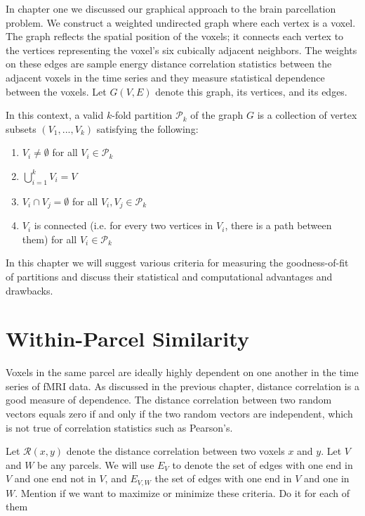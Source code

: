 
In chapter one we discussed our graphical approach to the brain
parcellation problem. We construct a weighted undirected graph where
each vertex is a voxel. The graph reflects the spatial position of the
voxels; it connects each vertex to the vertices representing the voxel's
six cubically adjacent neighbors. The weights on these edges are sample
energy distance correlation statistics between the adjacent voxels in
the time series and they measure statistical dependence between the
voxels. Let $G(V, E)$ denote this graph, its vertices, and its edges.

In this context, a valid $k$-fold partition $\mathcal{P}_k$ of the
graph $G$ is a collection of vertex subsets $(V_1, ..., V_k)$
satisfying the following:

\begin{enumerate}[1.]
\item
$V_i \neq \emptyset$ for all $V_i \in \mathcal{P}_k$

\item
$\bigcup\limits_{i=1}^k V_i = V$

\item
$V_i \cap V_j = \emptyset$ for all $V_i, V_j \in \mathcal{P}_k$

\item
$V_i$ is connected (i.e. for every two vertices in $V_i$, there is a
path between them) for all $V_i \in \mathcal{P}_k$
\end{enumerate}

In this chapter we will suggest various criteria for measuring the
goodness-of-fit of partitions and discuss their statistical and
computational advantages and drawbacks.


\section{Within-Parcel Similarity}

Voxels in the same parcel are ideally highly dependent on one another in
the time series of fMRI data. As discussed in the previous chapter,
distance correlation is a good measure of dependence. The distance
correlation between two random vectors equals zero if and only if the
two random vectors are independent, which is not true of correlation
statistics such as Pearson's.

Let $\mathcal{R}(x,y)$ denote the distance correlation between two
voxels $x$ and $y$.
Let $V$ and $W$ be any parcels. We will use $E_V$ to denote the set of edges with one end in $V$ and one end not in $V$, and $E_{V,W}$ the set
of edges with one end in $V$ and one in $W$. {\color{red}Mention if we want to
maximize or minimize these criteria. Do it for each of them}

